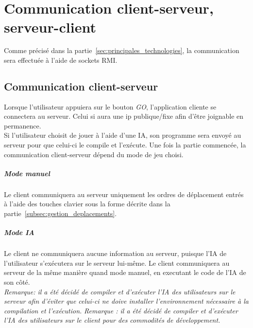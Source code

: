 \chapter{Communication client-serveur, serveur-client}
    Comme précisé dans la partie~\ref{sec:principales_technologies}, la communication sera effectuée à l'aide de \color{red}sockets \color{green}RMI\color{black}.


    \section{Communication client-serveur}
        Lorsque l'utilisateur appuiera sur le bouton \emph{GO}, l'application cliente se connectera au serveur. Celui si aura une ip publique/fixe afin d'être joignable en permanence.\\
\color{red}
        Si l'utilisateur choisit de jouer à l'aide d'une IA, son programme sera envoyé au serveur pour que celui-ci le compile et l'exécute. Une fois la partie commencée, la communication client-serveur dépend du mode de jeu choisi.
\color{black}
        \paragraph{Mode manuel} Le client communiquera au serveur uniquement les ordres de déplacement entrés à l'aide des touches clavier sous la forme décrite dans la partie~\ref{subsec:gestion_deplacements}.

        \paragraph{Mode IA} \color{red}Le client ne communiquera aucune information au serveur, puisque l'IA de l'utilisateur s'exécutera sur le serveur lui-même. \color{green} Le client communiquera au serveur de la même manière quand mode manuel, en executant le code de l'IA de son côté.\\

\color{red}
        \emph{Remarque: il a été décidé de compiler et d'exécuter l'IA des utilisateurs sur le serveur afin d'éviter que celui-ci ne doive installer l'environnement nécessaire à la compilation et l'exécution.}
\color{black}
        \emph{Remarque : il a été décidé de compiler et d'exécuter l'IA des utilisateurs sur le client pour des commodités de développement.}



